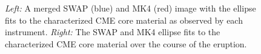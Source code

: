 \documentclass[preprint2]{aastex}
\begin{document}
\begin{figure}[!ht]
\centering
{}
\label{front_mults}
\label{ell_front}
\caption{\emph{Left:} A merged SWAP (blue) and MK4 (red) image with the ellipse fits to the characterized CME core material as observed by each instrument. \emph{Right:} The SWAP and MK4 ellipse fits to the characterized CME core material over the course of the eruption.}
\label{mk4_figs}
\end{figure}
\end{document}
